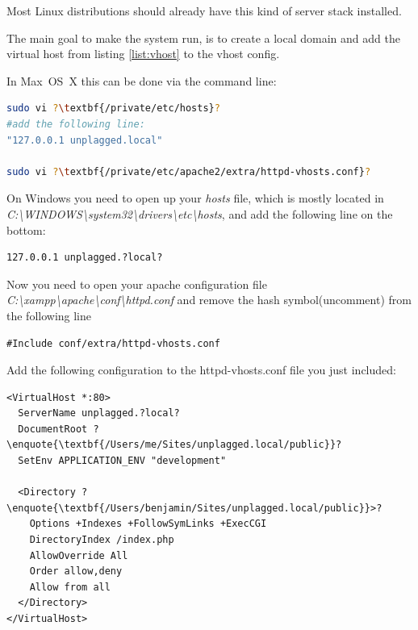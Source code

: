 Most Linux distributions should already have this kind of server stack installed.

The main goal to make the system run, is to create a local domain and add the virtual host from listing \ref{list:vhost} 
to the vhost config. 

In Max~OS~X this can be done via 
the command line: 

\begin{lstlisting}[caption=Mac OS X: Creating virtual host, language=bash]
sudo vi ?\textbf{/private/etc/hosts}?
#add the following line:
"127.0.0.1 unplagged.local"

sudo vi ?\textbf{/private/etc/apache2/extra/httpd-vhosts.conf}?
\end{lstlisting}

On Windows you need to open up your \textit{hosts} file, which is mostly located in \\
\textit{C:\textbackslash WINDOWS\textbackslash system32\textbackslash drivers\textbackslash etc\textbackslash hosts}, 
and add the following line on the bottom:

\begin{lstlisting}[caption=New host declaration]
127.0.0.1 unplagged.?local?
\end{lstlisting}

Now you need to open your apache configuration file 
\textit{C:\textbackslash xampp\textbackslash apache\textbackslash conf\textbackslash httpd.conf} and 
remove the hash symbol(uncomment) from the following line

\begin{lstlisting}[caption=httpd.conf]
#Include conf/extra/httpd-vhosts.conf
\end{lstlisting}

Add the following configuration to the httpd-vhosts.conf file you just included:

\begin{lstlisting}[caption=Apache configuration, label=list:vhost]
<VirtualHost *:80>
  ServerName unplagged.?local?
  DocumentRoot ?\enquote{\textbf{/Users/me/Sites/unplagged.local/public}}? 
  SetEnv APPLICATION_ENV "development" 
  
  <Directory ?\enquote{\textbf{/Users/benjamin/Sites/unplagged.local/public}}>?
    Options +Indexes +FollowSymLinks +ExecCGI
    DirectoryIndex /index.php
    AllowOverride All
    Order allow,deny
    Allow from all
  </Directory>
</VirtualHost>
\end{lstlisting}

